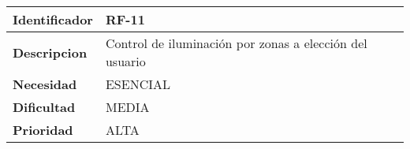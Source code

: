 \begin{center}
    \begin{tabular}{|p{2.6cm}|p{12cm}|}
    \hline
    \textbf{Identificador} & RF-11\\
    \hline
    \textbf{Descripcion} & Control de iluminación por zonas a elección del usuario\\
    \hline
    \textbf{Necesidad} & ESENCIAL\\
    \hline
    \textbf{Dificultad} & MEDIA\\
    \hline
    \textbf{Prioridad} & ALTA\\
    \hline
    \end{tabular}
\end{center}
